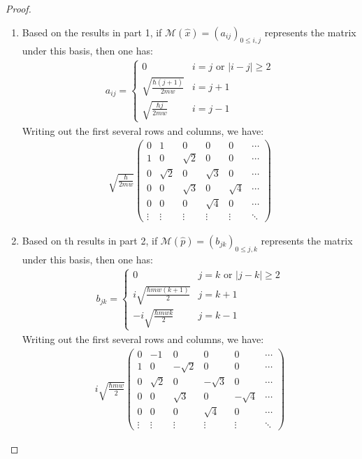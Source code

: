 \documentclass{article}
\begin{document}
\begin{proof}
\begin{enumerate}
        \hfil

        \item Based on the results in part 1, if $\mathcal{M}(\hat{x}) = (a_{ij})_{0\leq i,j}$ represents the matrix under this basis, then one has:
        \begin{align}
            a_{ij}=\begin{cases}
                0 & i=j \text{ or } |i-j|\geq 2\\
                \sqrt{\frac{\hbar (j+1)}{2mw}} & i=j+1\\
                \sqrt{\frac{\hbar j}{2mw}} & i=j-1
            \end{cases}
        \end{align}
        Writing out the first several rows and columns, we have:
        \begin{align}
            \sqrt{\frac{\hbar}{2mw}}\begin{pmatrix}
                0 & 1&0&0&0&\cdots\\
                1 & 0&\sqrt{2}&0&0&\cdots\\
                0&\sqrt{2}&0&\sqrt{3}&0&\cdots\\
                0 & 0& \sqrt{3} & 0 & \sqrt{4} & \cdots\\
                0 & 0 & 0 & \sqrt{4} & 0 & \cdots\\
                \vdots & \vdots & \vdots & \vdots & \vdots & \ddots
            \end{pmatrix}
        \end{align}

        \hfil

        \item Based on th results in part 2, if $\mathcal{M}(\hat{p}) = (b_{jk})_{0\leq j,k}$ represents the matrix under this basis, then one has:
        \begin{align}
            b_{jk} = \begin{cases}
                0 & j=k \text{ or } |j-k|\geq 2\\
                i\sqrt{\frac{\hbar mw(k+1)}{2}} & j=k+1\\
                -i\sqrt{\frac{\hbar mwk}{2}} & j=k-1
            \end{cases}
        \end{align}
        Writing out the first several rows and columns, we have:
        \begin{align}
            i\sqrt{\frac{\hbar mw}{2}}\begin{pmatrix}
                0 & -1 & 0&0&0&\cdots\\
                1&0&-\sqrt{2}&0&0&\cdots\\
                0&\sqrt{2}&0&-\sqrt{3}&0&\cdots\\
                0&0&\sqrt{3}&0&-\sqrt{4}&\cdots\\
                0&0&0&\sqrt{4}&0&\cdots\\
                \vdots &\vdots &\vdots &\vdots &\vdots &\ddots
            \end{pmatrix}
        \end{align}


\end{enumerate}
\end{proof}
\end{document}
